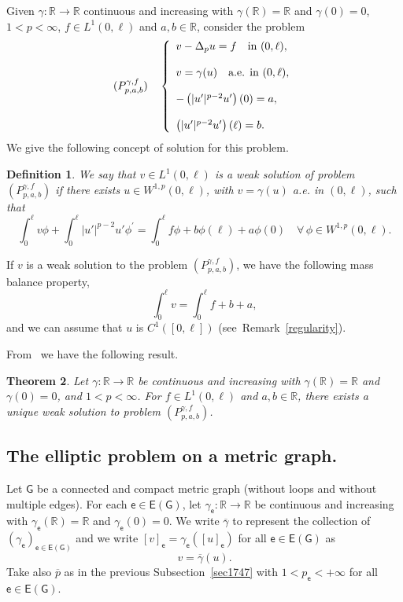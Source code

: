 \documentclass[reqno,12pt]{amsart}
\newtheorem{theorem}{Theorem}[section]
\newtheorem{definition}[theorem]{Definition}
\def\R{\mathbb R} %
\def\e{\mathsf{e}} 	%
\newcommand{\G}{\mathsf{G}}	%
\newcommand{\E}{\mathsf{E}}	%
\numberwithin{equation}{section} %
\begin{document}
 Given   $\gamma:\R \to \R$ continuous and increasing with $\gamma(\mathbb{R})=\mathbb{R}$ and $\gamma(0)=0$,  $1 < p < \infty$, $f \in L^1(0,\ell)$ and $a,b \in \R$,   consider the problem
$$(P_{p,a,b}^{\gamma,f})\quad\left\{\begin{array}{lll}
v -\Delta_{p} u =f \quad\hbox{in } (0,\ell),\\
\\
v =\gamma(u)\quad\hbox{a.e. in } (0,\ell),
\\ \\
-\left(\vert u'\vert^{p-2} u' \right)(0)=a,\\ \\ \left(\vert u'\vert^{p-2} u' \right)(\ell)=b.
\end{array}\right.$$
We give the following concept of solution for this problem.
\begin{definition} \rm We say that   $ v\in L^1(0, \ell)$  is a {\it weak solution} of problem $(P_{p,a,b}^{\gamma,f})$ if   there exists $u\in W^{1,p}(0,\ell)$, with  $v=\gamma(u)$ a.e. in $(0, \ell)$, such that
\begin{equation}\label{Weak1NN}\int_0^{\ell} v \phi   + \int_{0}^{\ell}|u'|^{p-2}u' \phi^{\prime}    = \int_0^{\ell} f \phi  +     b\phi(\ell) + a\phi(0) \quad \forall \, \phi \in W^{1,p}(0, \ell). \end{equation}
\end{definition}
 

  If $v$ is a weak solution to the problem $(P_{p,a,b}^{\gamma,f})$, we have the following  mass balance property,
\begin{equation}\label{test1}
\int_0^{\ell} v =\int_0^{\ell} f  +  b + a,
\end{equation}
  and we can assume that $u$ is $C^1([0,\ell])$ (see~Remark~\ref{regularity}).


From~\cite[Theorem 3.6]{AndIgMazTo07} we have the following result.

\begin{theorem}\label{lemma1}  Let $\gamma:\R \to \R$ be continuous and increasing with $\gamma(\mathbb{R})=\mathbb{R}$ and $\gamma(0)=0$, and   $1 < p < \infty$. For $f \in L^1(0,\ell)$ and $a,b \in \R$, there exists a unique weak solution to problem $(P_{p,a,b}^{\gamma,f})$.
\end{theorem}



 
 \subsection{The elliptic problem on a metric graph.} Let  $\G$ be a   connected and compact metric graph  (without loops and without multiple edges).
 For each   $\e\in \E(\G)$, let $\gamma_\e:\R \to \R$ be continuous and increasing with $\gamma_\e(\mathbb{R})=\mathbb{R}$ and $\gamma_\e(0)=0$. 
   We write $\overline{\gamma}$ to represent  the collection of $(\gamma_\e)_{\e \in \E(\G)}$ and 
we  write $[v]_\e=\gamma_\e([u]_\e)$  for all $\e\in  \E(\G)$ as
 $$v= \overline{\gamma}(u).$$
Take also $\overline{p}$ as in the previous Subsection~\ref{sec1747} with $1<p_\e<+\infty$ for all $\e\in \E(\G)$.
\end{document}
